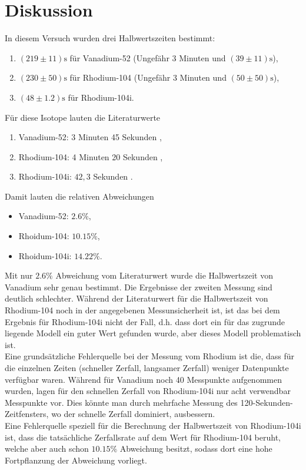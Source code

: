 \section{Diskussion}
\label{sec:Diskussion}

In diesem Versuch wurden drei Halbwertszeiten bestimmt:
\begin{enumerate}
	\item $(219 \pm 11) \si{\second}$ für Vanadium-52 (Ungefähr 3 Minuten und $(39 \pm 11)\si{\second}$),
	\item $(230 \pm 50) \si{\second}$ für Rhodium-104 (Ungefähr 3 Minuten und $(50 \pm 50)\si{\second}$),
	\item $(48 \pm 1.2) \si{\second}$ für Rhodium-104i.
\end{enumerate}
\noindent
Für diese Isotope lauten die Literaturwerte
\begin{enumerate}
	\item Vanadium-52: 3 Minuten 45 Sekunden \cite{chemie-vanadium},
	\item Rhodium-104: 4 Minuten 20 Sekunden \cite{internetchemie-rhodium},
	\item Rhodium-104i: $42,3$ Sekunden \cite{internetchemie-rhodium}.
\end{enumerate}
Damit lauten die relativen Abweichungen
\begin{itemize}
	\item Vanadium-52: $2.6\%$,
	\item Rhoidum-104: $10.15\%$,
	\item Rhoidum-104i: $14.22\%$.
\end{itemize}

\noindent
Mit nur $2.6\%$ Abweichung vom Literaturwert wurde die Halbwertszeit von Vanadium sehr genau bestimmt. Die 
Ergebnisse der zweiten Messung sind deutlich schlechter. Während der Literaturwert für die Halbwertszeit
von Rhodium-104 noch in der angegebenen Messunsicherheit ist, ist das bei dem Ergebnis für Rhodium-104i nicht
der Fall, d.h. dass dort ein für das zugrunde liegende Modell ein guter Wert gefunden wurde, aber dieses Modell
problematisch ist.
\\
Eine grundsätzliche Fehlerquelle bei der Messung vom Rhodium ist die, dass für die einzelnen Zeiten (schneller
Zerfall, langsamer Zerfall) weniger Datenpunkte verfügbar waren. Während für Vanadium noch 40 Messpunkte
aufgenommen wurden, lagen für den schnellen Zerfall von Rhodium-104i nur acht verwendbar Messpunkte vor.
Dies könnte man durch mehrfache Messung des 120-Sekunden-Zeitfensters, wo der schnelle Zerfall dominiert, 
ausbessern.
\\
Eine Fehlerquelle speziell für die Berechnung der Halbwertszeit von Rhodium-104i ist, 
dass die tatsächliche Zerfallsrate
auf dem Wert für Rhodium-104 beruht, welche aber auch schon $10.15\%$ Abweichung besitzt, sodass dort 
eine hohe Fortpflanzung der Abweichung vorliegt.
